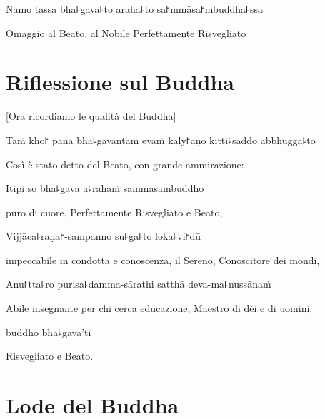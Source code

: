 Namo tassa bha꜕gava꜕to araha꜕to sa꜓mmāsa꜓mbuddha꜕ssa
\begin{english}
Omaggio al Beato, al Nobile Perfettamente Risvegliato
\end{english}

\chapter*{Riflessione sul Buddha}

\delegateSetUseNext

\begin{leader}
\end{leader}

\begin{english}
[Ora ricordiamo le qualità del Buddha]
\end{english}

Taṁ kho꜓ pana bha꜕gavantaṁ evaṁ kaly꜓āṇo kitti꜕saddo abbhugga꜕to\\
\begin{english}
Così è stato detto del Beato, con grande ammirazione:
\end{english}
Itipi so bha꜕gavā a꜕rahaṁ sammāsambuddho\\
\begin{english}
puro di cuore, Perfettamente Risvegliato e Beato,
\end{english}
Vijjāca꜕raṇa꜓-sampanno su꜕ga꜕to loka꜕vi꜓dū\\
\begin{english}
impeccabile in condotta e conoscenza, il Sereno, Conoscitore dei mondi,
\end{english}
Anu꜓tta꜕ro purisa꜕damma-sārathi satthā deva-ma꜕nussānaṁ\\
\begin{english}
Abile insegnante per chi cerca educazione, Maestro di dèi e di uomini;
\end{english}
\vin buddho bha꜕gavā'ti
\begin{english}
Risvegliato e Beato.
\end{english}
\clearpage


\chapter*{Lode del Buddha}

\delegateSetUseNext

\begin{leader}
\end{leader}

